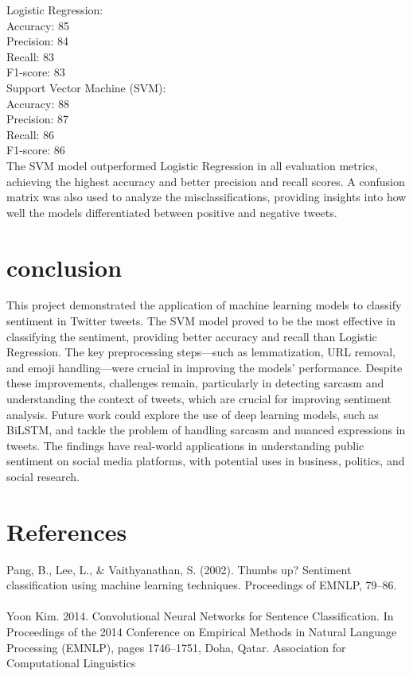 \documentclass[conference]{IEEEtran}
\begin{document}
    Logistic Regression:
\\
        Accuracy: 85%
\\
        Precision: 84%
\\
        Recall: 83%
\\
        F1-score: 83%
\\
    Support Vector Machine (SVM):
\\
        Accuracy: 88%
\\
        Precision: 87%
\\
        Recall: 86%
\\
        F1-score: 86%
\\
The SVM model outperformed Logistic Regression in all evaluation metrics, achieving the highest accuracy and better precision and recall scores. 
A confusion matrix was also used to analyze the misclassifications, providing insights into how well the models differentiated between positive
 and negative tweets.
\section{conclusion}
This project demonstrated the application of machine learning models to classify sentiment in Twitter tweets. The SVM model proved to be the 
most effective in classifying the sentiment, providing better accuracy and recall than Logistic Regression. The key preprocessing steps—such as 
lemmatization, URL removal, and emoji handling—were crucial in improving the models' performance. Despite these improvements, challenges remain, 
particularly in detecting sarcasm and understanding the context of tweets, which are crucial for improving sentiment analysis. Future work could 
explore the use of deep learning models, such as BiLSTM, and tackle the problem of handling sarcasm and nuanced expressions in tweets. The findings
 have real-world applications in understanding public sentiment on social media platforms, with potential uses in business, politics, and social 
 research.
\section*{References}
Pang, B., Lee, L., & Vaithyanathan, S. (2002). Thumbs up? Sentiment classification using machine learning techniques. Proceedings of EMNLP, 79–86. 
\\
\\
Yoon Kim. 2014. Convolutional Neural Networks for Sentence Classification. In Proceedings of the 2014 Conference on Empirical Methods in Natural 
Language Processing (EMNLP), pages 1746–1751, Doha, Qatar. Association for Computational Linguistics
\begin{thebibliography}{00}
\bibitem
\end{thebibliography}
\vspace{12pt}
\end{document}
